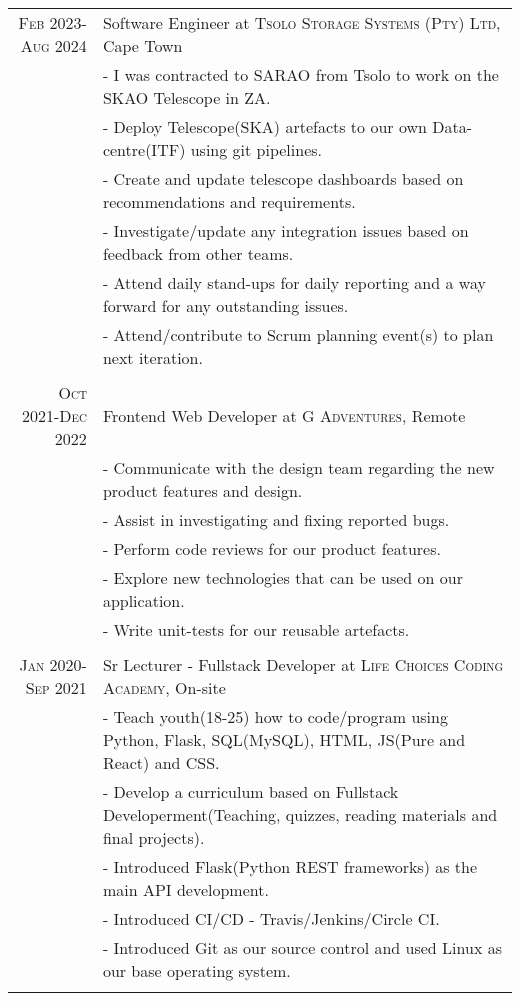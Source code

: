 \documentclass[a4paper,10pt]{article} %
\begin{document}
\begin{tabular}{r|p{11cm}}
\textsc{Feb 2023-Aug 2024} & Software Engineer at \textsc{Tsolo Storage Systems (Pty) Ltd}, Cape Town \emph{}\\
& \footnotesize{- I was contracted to SARAO from Tsolo to work on the SKAO Telescope in ZA.}\\
& \footnotesize{- Deploy Telescope(SKA) artefacts to our own Data-centre(ITF) using git pipelines.}\\
& \footnotesize{- Create and update telescope dashboards based on recommendations and requirements.}\\
& \footnotesize{- Investigate/update any integration issues based on feedback from other teams.}\\
& \footnotesize{- Attend daily stand-ups for daily reporting and a way forward for any outstanding issues.}\\
& \footnotesize{- Attend/contribute to Scrum planning event(s) to plan next iteration.}\\
\multicolumn{2}{c}{} \\


\textsc{Oct 2021-Dec 2022} & Frontend Web Developer at \textsc{G Adventures}, Remote \emph{}\\
& \footnotesize{- Communicate with the design team regarding the new product features and design.}\\
& \footnotesize{- Assist in investigating and fixing reported bugs.}\\
& \footnotesize{- Perform code reviews for our product features.}\\
& \footnotesize{- Explore new technologies that can be used on our application.}\\
& \footnotesize{- Write unit-tests for our reusable artefacts.}\\
\multicolumn{2}{c}{} \\


\textsc{Jan 2020-Sep 2021} & Sr Lecturer - Fullstack Developer at \textsc{Life Choices Coding Academy}, On-site \emph{}\\
& \footnotesize{- Teach youth(18-25) how to code/program using  Python, Flask, SQL(MySQL), HTML, JS(Pure and React) and CSS.}\\
& \footnotesize{- Develop a curriculum based on Fullstack Developerment(Teaching, quizzes, reading materials and final projects).}\\
& \footnotesize{- Introduced  Flask(Python  REST frameworks) as the main API development.}\\
& \footnotesize{- Introduced CI/CD - Travis/Jenkins/Circle CI.}\\
& \footnotesize{- Introduced Git as our source control and used Linux as our base operating system.}\\
\multicolumn{2}{c}{} \\


\end{tabular}
\end{document}
